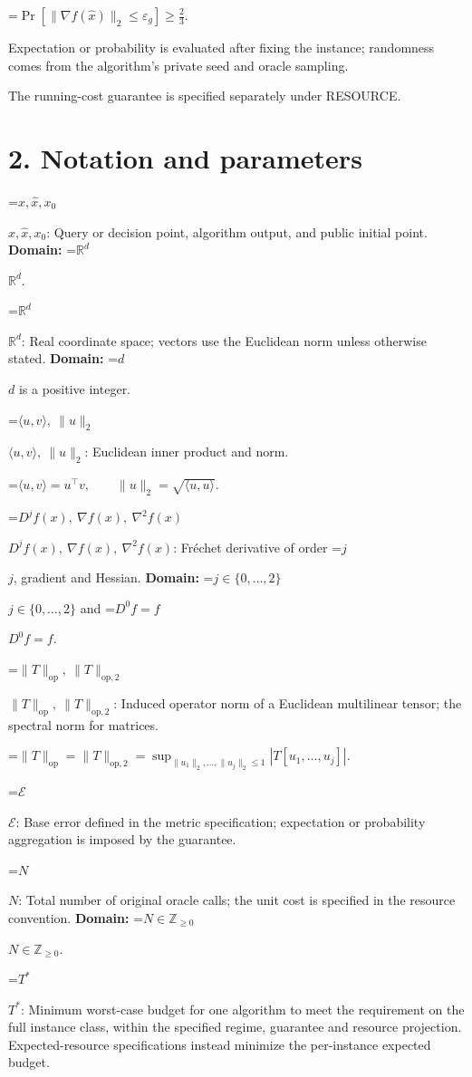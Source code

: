 \documentclass[10pt,a4paper]{article}
\newcommand{\AtlasMath}[1]{\par\begingroup\centering\setbox0=\hbox{$\displaystyle #1$}\ifdim\wd0>1.4\linewidth\typeout{ATLAS WIDE FORMULA: \the\wd0}\fi\ifdim\wd0>\linewidth\resizebox{\linewidth}{!}{\box0}\else\box0\fi\par\endgroup}
\newcommand{\AtlasInlineMath}[1]{\begingroup\setbox0=\hbox{$#1$}\ifdim\wd0>.4\linewidth\endgroup\AtlasMath{#1}\else\endgroup$#1$\fi}
\begin{document}
\AtlasMath{\Pr\!\left[\|\nabla f(\widehat{x})\|_2\le \varepsilon_g\right]\ge\frac23.}


Expectation or probability is evaluated after fixing the instance; randomness comes from the algorithm's private seed and oracle sampling.

The running-cost guarantee is specified separately under RESOURCE.

\section{2. Notation and parameters}
\AtlasInlineMath{x,\widehat{x},x_0}: Query or decision point, algorithm output, and public initial point. \textbf{Domain:} \AtlasInlineMath{\mathbb{R}^d}.

\AtlasInlineMath{\mathbb{R}^d}: Real coordinate space; vectors use the Euclidean norm unless otherwise stated. \textbf{Domain:} \AtlasInlineMath{d} is a positive integer.

\AtlasInlineMath{\langle u,v\rangle,\ \|u\|_2}: Euclidean inner product and norm.


\AtlasMath{\langle u,v\rangle=u^\top v,\qquad\|u\|_2=\sqrt{\langle u,u\rangle}.}


\AtlasInlineMath{D^jf(x),\ \nabla f(x),\ \nabla^2f(x)}: Fréchet derivative of order \AtlasInlineMath{j}, gradient and Hessian. \textbf{Domain:} \AtlasInlineMath{j\in\{0,\ldots,2\}} and \AtlasInlineMath{D^0f=f}.

\AtlasInlineMath{\|T\|_{\mathrm{op}},\ \|T\|_{\mathrm{op},2}}: Induced operator norm of a Euclidean multilinear tensor; the spectral norm for matrices.


\AtlasMath{\|T\|_{\mathrm{op}}=\|T\|_{\mathrm{op},2}=\sup_{\|u_1\|_2,\ldots,\|u_j\|_2\le1}|T[u_1,\ldots,u_j]|.}


\AtlasInlineMath{\mathcal{E}}: Base error defined in the metric specification; expectation or probability aggregation is imposed by the guarantee.

\AtlasInlineMath{N}: Total number of original oracle calls; the unit cost is specified in the resource convention. \textbf{Domain:} \AtlasInlineMath{N\in\mathbb{Z}_{\ge0}}.

\AtlasInlineMath{T^*}: Minimum worst-case budget for one algorithm to meet the requirement on the full instance class, within the specified regime, guarantee and resource projection. Expected-resource specifications instead minimize the per-instance expected budget.
\end{document}

